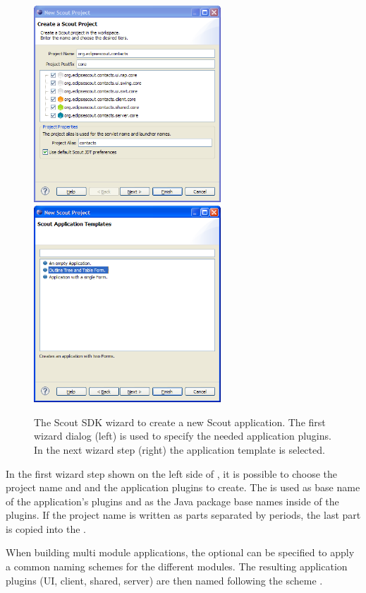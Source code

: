 \documentclass[a4paper,10pt,twoside]{book}
\begin{document}
\begin{figure}
\includegraphics[width=7cm]{wizard_new_project_1.png} \hspace{5mm}
\includegraphics[width=7cm]{wizard_new_project_2.png}
\caption{The Scout SDK wizard to create a new Scout application.
The first wizard dialog (left) is used to specify the needed application plugins. 
In the next wizard step (right) the application template is selected.}
\end{figure}

In the first wizard step shown on the left side of , it is possible to choose the project name and and the application plugins to create.
The  is used as base name of the application's plugins and as the Java package base names inside of the plugins. 
If the project name is written as parts separated by periods, the last part is copied into the .

When building multi module applications, the optional  can be specified to apply a common naming schemes for the different modules.
The resulting application plugins (UI, client, shared, server) are then named following the scheme . 
\end{document}
